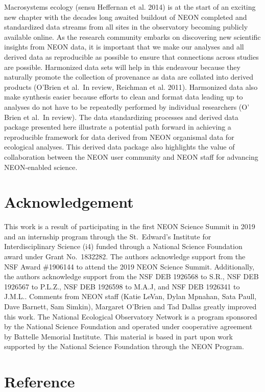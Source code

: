 \documentclass[
  12pt,
]{article}
\begin{document}
Macrosystems ecology (sensu Heffernan et al. 2014) is at the start of an exciting new chapter with the decades long awaited buildout of NEON completed and standardized data streams from all sites in the observatory becoming publicly available online. As the research community embarks on discovering new scientific insights from NEON data, it is important that we make our analyses and all derived data as reproducible as possible to ensure that connections across studies are possible. Harmonized data sets will help in this endeavour because they naturally promote the collection of provenance as data are collated into derived products (O'Brien et al.~In review, Reichman et al. 2011). Harmonized data also make synthesis easier because efforts to clean and format data leading up to analyses do not have to be repeatedly performed by individual researchers (O' Brien et al.~In review). The data standardizing processes and derived data package presented here illustrate a potential path forward in achieving a reproducible framework for data derived from NEON organismal data for ecological analyses. This derived data package also highlights the value of collaboration between the NEON user community and NEON staff for advancing NEON-enabled science.

\hypertarget{acknowledgement}{%
\section{Acknowledgement}\label{acknowledgement}}

This work is a result of participating in the first NEON Science Summit in 2019 and an internship program through the St.~Edward's Institute for Interdisciplinary Science (i4) funded through a National Science Foundation award under Grant No.~1832282. The authors acknowledge support from the NSF Award \#1906144 to attend the 2019 NEON Science Summit. Additionally, the authors acknowledge support from the NSF DEB 1926568 to S.R., NSF DEB 1926567 to P.L.Z., NSF DEB 1926598 to M.A.J, and NSF DEB 1926341 to J.M.L.. Comments from NEON staff (Katie LeVan, Dylan Mpnahan, Sata Paull, Dave Barnett, Sam Simkin), Margaret O'Brien and Tad Dallas greatly improved this work. The National Ecological Observatory Network is a program sponsored by the National Science Foundation and operated under cooperative agreement by Battelle Memorial Institute. This material is based in part upon work supported by the National Science Foundation through the NEON Program.

\hypertarget{reference}{%
\section*{Reference}\label{reference}}
\end{document}
